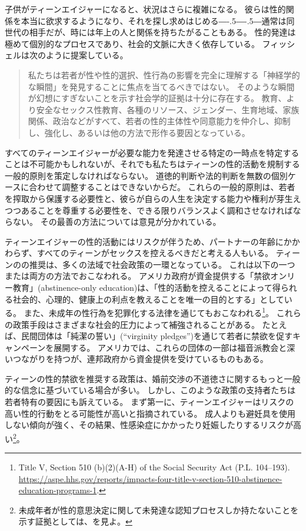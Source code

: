 \documentclass[paper=a4,book,openany]{jlreq}
\def\DDASH{―\kern-.5\zw―\kern-.5\zw―} %
\begin{document}
子供がティーンエイジャーになると、状況はさらに複雑になる。
彼らは性的関係を本当に欲求するようになり、それを探し求めはじめる{\DDASH}通常は同世代の相手だが、時には年上の人と関係を持ちたがることもある。
性的発達は極めて個別的なプロセスであり、社会的文脈に大きく依存している。
フィッシェルは次のように提案している。

\begin{quote}
私たちは若者が性や性的選択、性行為の影響を完全に理解する「神経学的な瞬間」を発見することに焦点を当てるべきではない。
そのような瞬間が幻想にすぎないことを示す社会学的証拠は十分に存在する。
教育、より安全なセックス性教育、各種のリソース、ジェンダー、生育地域、家族関係、政治などがすべて、若者の性的主体性や同意能力を仲介し、抑制し、強化し、あるいは他の方法で形作る要因となっている。
\citep[p.305]{fischel10:_per_se_power}
\end{quote}

すべてのティーンエイジャーが必要な能力を発達させる特定の一時点を特定することは不可能かもしれないが、それでも私たちはティーンの性的活動を規制する一般的原則を策定しなければならない。
道徳的判断や法的判断を無数の個別ケースに合わせて調整することはできないからだ。
これらの一般的原則は、若者を搾取から保護する必要性と、彼らが自らの人生を決定する能力や権利が芽生えつつあることを尊重する必要性を、できる限りバランスよく調和させなければならない。
その最善の方法については意見が分かれている。

ティーンエイジャーの性的活動にはリスクが伴うため、パートナーの年齢にかかわらず、すべてのティーンがセックスを控えるべきだと考える人もいる。
ティーンのの推奨は、多くの法域で社会政策の一環となっている。
これは以下の一つまたは両方の方法でおこなわれる。
アメリカ政府が資金提供する「禁欲オンリー教育」(abstinence-only education)は、「性的活動を控えることによって得られる社会的、心理的、健康上の利点を教えることを唯一の目的とする」としている。
また、未成年の性行為を犯罪化する法律を通じてもおこなわれる\footnote{Title V, Section 510 (b)(2)(A-H) of the Social Security Act (P.L. 104--193). \url{https://aspe.hhs.gov/reports/impacts-four-title-v-section-510-abstinence-education-programs-1}.}。
これらの政策手段はさまざまな社会的圧力によって補強されることがある。
たとえば、民間団体は「純潔の誓い」(``virginity pledges'')を通じて若者に禁欲を促すキャンペーンを展開する。
アメリカでは、これらの団体の一部は福音派教会と深いつながりを持つが、連邦政府から資金提供を受けているものもある。

ティーンの性的禁欲を推奨する政策は、婚前交渉の不道徳さに関するもっと一般的な信念に基づいている場合が多い。
しかし、このような政策の支持者たちは若者特有の要因にも訴えている。
まず第一に、ティーンエイジャーはリスクの高い性的行動をとる可能性が高いと指摘されている。
成人よりも避妊具を使用しない傾向が強く、その結果、性感染症にかかったり妊娠したりするリスクが高い\footnote{未成年者が性的意思決定に関して未発達な認知プロセスしか持たないことを示す証拠としては、\citet{drobac14:_neurob_decis_makin_high_risk}を見よ。
}。
\end{document}
